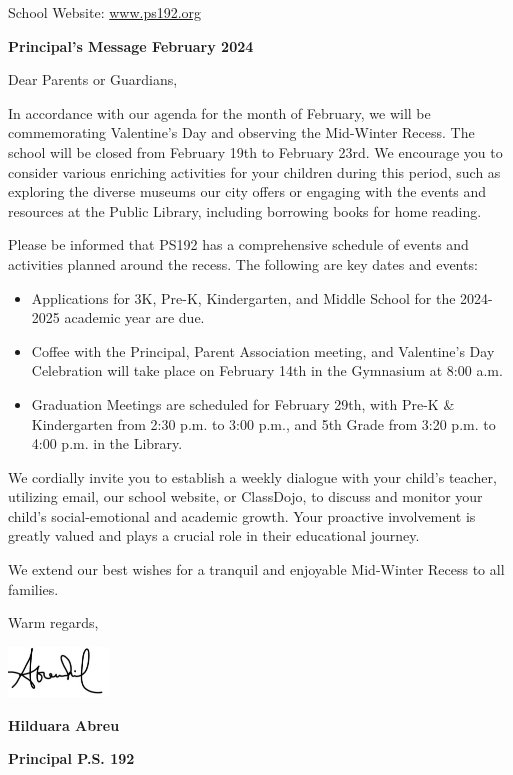 \documentclass[12pt,letterpaper]{article}
\begin{document}
\vspace*{0.5in}
School Website: \href{https://www.ps192.org}{www.ps192.org}

\textbf{Principal's Message February 2024}

Dear Parents or Guardians,

In accordance with our agenda for the month of February, we will be commemorating Valentine’s Day and observing the Mid-Winter Recess. The school will be closed from February 19th to February 23rd. We encourage you to consider various enriching activities for your children during this period, such as exploring the diverse museums our city offers or engaging with the events and resources at the Public Library, including borrowing books for home reading.
 
Please be informed that PS192 has a comprehensive schedule of events and activities planned around the recess. The following are key dates and events:
\begin{itemize}
\item Applications for 3K, Pre-K, Kindergarten, and Middle School for the 2024-2025 academic year are due.
\item Coffee with the Principal, Parent Association meeting, and Valentine’s Day Celebration will take place on February 14th in the Gymnasium at 8:00 a.m.
\item Graduation Meetings are scheduled for February 29th, with Pre-K \& Kindergarten from 2:30 p.m. to 3:00 p.m., and 5th Grade from 3:20 p.m. to 4:00 p.m. in the Library.
\end{itemize}

We cordially invite you to establish a weekly dialogue with your child’s teacher, utilizing email, our school website, or ClassDojo, to discuss and monitor your child’s social-emotional and academic growth. Your proactive involvement is greatly valued and plays a crucial role in their educational journey.

We extend our best wishes for a tranquil and enjoyable Mid-Winter Recess to all families.

Warm regards,

\includegraphics[width=0.2\textwidth]{hil_signature}

\textbf{Hilduara Abreu}

\textbf{Principal P.S. 192}
\end{document}
